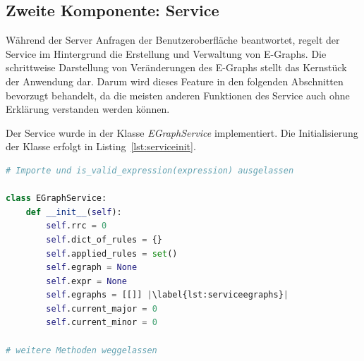 





















\subsection{Zweite Komponente: Service}

Während der Server Anfragen der Benutzeroberfläche beantwortet, regelt der Service im Hintergrund die Erstellung und Verwaltung von E-Graphs.
Die schrittweise Darstellung von Veränderungen des E-Graphs stellt das Kernstück der Anwendung dar. Darum wird dieses Feature in den folgenden Abschnitten bevorzugt behandelt,
da die meisten anderen Funktionen des Service auch ohne Erklärung verstanden werden können.

Der Service wurde in der Klasse \textit{EGraphService} implementiert. Die Initialisierung der Klasse erfolgt in Listing~\ref{lst:serviceinit}.

\begin{lstlisting}[language=Python, escapechar=|, caption=Auszug aus der Datei \textit{EGraphService.py}, label={lst:serviceinit}]
# Importe und is_valid_expression(expression) ausgelassen 

class EGraphService:
    def __init__(self):
        self.rrc = 0
        self.dict_of_rules = {}
        self.applied_rules = set()
        self.egraph = None
        self.expr = None
        self.egraphs = [[]] |\label{lst:serviceegraphs}|
        self.current_major = 0
        self.current_minor = 0

# weitere Methoden weggelassen
\end{lstlisting} 

